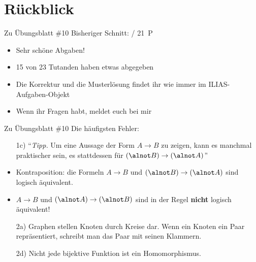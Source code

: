 

\newcommand{\handout}{}



\morescalingdelimiters



\section{Rückblick}

\begin{frame}{Zu Übungsblatt \#10}
	Bisheriger Schnitt:  / 21~P

	\begin{itemize}
		\item Sehr schöne Abgaben!
		\item 15 von 23 Tutanden haben etwas abgegeben
		\item Die Korrektur und die Musterlösung findet ihr wie immer im ILIAS-Aufgaben-Objekt
		\item Wenn ihr Fragen habt, meldet euch bei mir
	\end{itemize}
\end{frame}

\begin{frame}{Zu Übungsblatt \#10}
	Die häufigsten Fehler:
	\begin{itemize}[<+->]
		\item[1c)] ``\textit{Tipp. } Um eine Aussage der Form $A \rightarrow B$ zu zeigen, kann es manchmal praktischer sein, es stattdessen für $(\alnot B) \rightarrow (\alnot A)$''
		\item Kontraposition: die Formeln $A \rightarrow B$ und $(\alnot B) \rightarrow (\alnot A)$ sind logisch äquivalent.
		\item $A \rightarrow B$ und $(\alnot A) \rightarrow (\alnot B)$ sind in der Regel \textbf{nicht} logisch äquivalent!
		\item[2a)] Graphen stellen Knoten durch Kreise dar. Wenn ein Knoten ein Paar repräsentiert, schreibt man das Paar mit seinen Klammern.
		\item[2d)] Nicht jede bijektive Funktion ist ein Homomorphismus.
	\end{itemize}
\end{frame}

